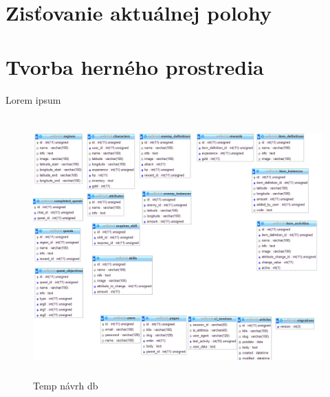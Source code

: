 \section{Zisťovanie aktuálnej polohy}


\section{Tvorba herného prostredia}











\paragraph{}
Lorem ipsum 
\begin{figure}[h]
  \centering
  \includegraphics[height=10cm]{mainmatter/imgs/dbtemp.png}
  \caption{Temp návrh db}
  \label{fig:comenius}
\end{figure}
